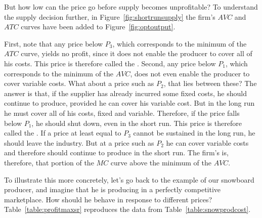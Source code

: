 But how low can the price go before supply becomes unprofitable? To understand the supply decision further, in Figure~\ref{fig:shortrunsupply} the firm's $AVC$ and $ATC$ curves have been added to Figure~\ref{fig:optoutput}.



First, note that any price below $P_3$, which corresponds to the minimum of the $ATC$ curve, yields no profit, since it does not enable the producer to cover all of his costs. This price is therefore called the . Second, any price below $P_1$, which corresponds to the minimum of the $AVC$, does not even enable the producer to cover variable costs. What about a price such as $P_2$, that lies between these? The answer is that, if the supplier has already incurred some fixed costs, he should continue to produce, provided he can cover his variable cost. But in the long run he must cover all of his costs, fixed and variable. Therefore, if the price falls below $P_1$, he should shut down, even in the short run. This price is therefore called the . If a price at least equal to $P_3$ cannot be sustained in the long run, he should leave the industry. But at a price such as $P_2$ he can cover variable costs and therefore should continue to produce in the short run. The firm's  is, therefore, that portion of the $MC$ curve above the minimum of the $AVC$. 

To illustrate this more concretely, let's go back to the example of our snowboard producer, and imagine that he is producing in a perfectly competitive marketplace. How should he behave in response to different prices? Table~\ref{table:profitmaxsr} reproduces the data from Table~\ref{table:snowprodcost}.


